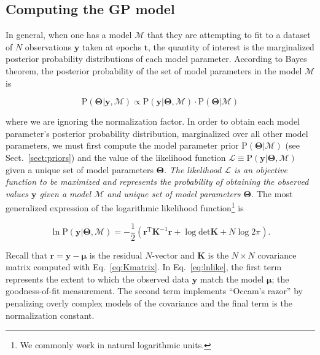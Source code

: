 \subsection{Computing the GP model} \label{sect:bayes}
In general, when one has a model $\mathcal{M}$ 
that they are attempting to fit to a dataset of $N$ observations 
$\mathbf{y}$ taken at epochs $\mathbf{t}$, the quantity of interest is the marginalized 
posterior probability distributions of each model parameter. According to Bayes theorem, 
the posterior probability of the set of model parameters in the model $\mathcal{M}$ is 

\begin{equation}
\mathrm{P} (\mathbf{\Theta} | \mathbf{y}, \mathcal{M}) \propto \mathrm{P} (\mathbf{y} | \mathbf{\Theta}, \mathcal{M}) 
\cdot \mathrm{P} (\mathbf{\Theta}|\mathcal{M})
\end{equation}

\noindent where we are ignoring the normalization factor. In order to obtain each model 
parameter's posterior probability distribution, marginalized 
over all other model parameters, we must first compute the model parameter prior 
$\mathrm{P}(\mathbf{\Theta}|\mathcal{M})$ (see Sect.~\ref{sect:priors})
and the value of the likelihood function 
$\mathcal{L} \equiv \mathrm{P} (\mathbf{y} | \mathbf{\Theta},\mathcal{M})$ given a unique set of 
model parameters $\mathbf{\Theta}$. \emph{The likelihood $\mathcal{L}$ is an objective function 
to be maximized and represents 
the probability of obtaining the observed values $\mathbf{y}$ given a model $\mathcal{M}$ 
and unique set of model parameters $\mathbf{\Theta}$.} 
The most generalized expression of the logarithmic likelihood function\footnote{We commonly 
work in natural logarithmic units.} is 

\begin{equation}
\ln{\mathrm{P}(\mathbf{y} | \mathbf{\Theta},\mathcal{M})} = -\frac{1}{2} \left( \mathbf{r}^{\mathrm{T}} 
\mathbf{K}^{-1} \mathbf{r} + \log{\mathrm{det} \mathbf{K}} + N \log{2\pi} \right).
\label{eq:lnlike}
\end{equation}

\noindent Recall that $\mathbf{r}=\mathbf{y}-\boldsymbol{\mu}$ 
is the residual $N$-vector and $\mathbf{K}$ is the $N \times N$ covariance matrix 
computed with Eq.~\ref{eq:Kmatrix}. 
In Eq.~\ref{eq:lnlike}, the first term represents the extent to which the observed data 
$\mathbf{y}$ match the model $\boldsymbol{\mu}$; the goodness-of-fit measurement. The second 
term implements ``Occam's razor'' by penalizing overly complex models of the covariance and 
the final term is the normalization constant. \\

